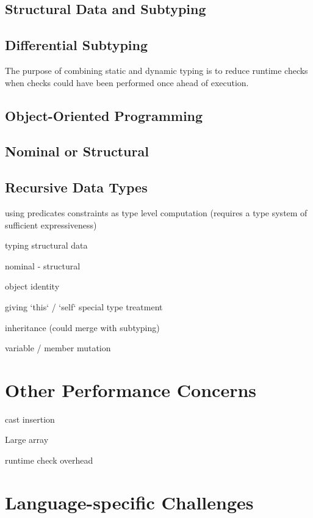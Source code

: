 \subsection{Structural Data and Subtyping}

\subsection{Differential Subtyping}

The purpose of combining static and dynamic typing is to reduce
runtime checks when checks could have been performed once ahead of execution.

\subsection{Object-Oriented Programming}

\subsection{Nominal or Structural}

\subsection{Recursive Data Types}

using predicates
constraints as type level computation (requires a type system of sufficient expressiveness)

typing structural data

nominal
- structural

object identity

giving `this` / `self` special type treatment

inheritance (could merge with subtyping)

variable / member mutation

\section{Other Performance Concerns}

cast insertion

Large array

runtime check overhead

\section{Language-specific Challenges}

\renewcommand{\thechapter}{4}
